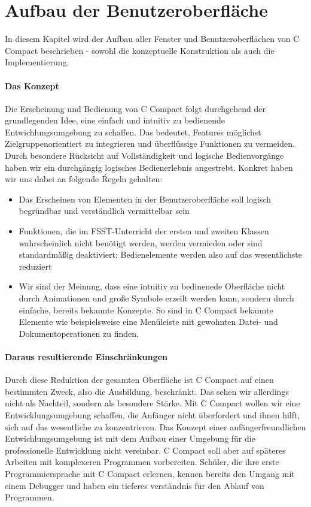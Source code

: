 

\chapter{Aufbau der Benutzeroberfläche}
In diesem Kapitel wird der Aufbau aller Fenster und Benutzeroberflächen von C Compact beschrieben - sowohl die konzeptuelle Konstruktion als auch die Implementierung.
\subsubsection*{Das Konzept}
Die Erscheinung und Bedienung von C Compact folgt durchgehend der grundlegenden Idee, eine einfach und intuitiv zu bedienende Entwichlungsumgebung zu schaffen. Das bedeutet, Features möglichst Zielgruppenorientiert zu integrieren und überflüssige Funktionen zu vermeiden. Durch besondere Rücksicht auf Vollständigkeit und logische Bedienvorgänge haben wir ein durchgängig logisches Bedienerlebnis angestrebt.
Konkret haben wir uns dabei an folgende Ŕegeln gehalten:
\begin{itemize}
\item Das Erscheinen von Elementen in der Benutzeroberfläche soll logisch begründbar und verständlich vermittelbar sein
\item Funktionen, die im FSST-Unterricht der ersten und zweiten Klassen wahrscheinlich nicht benötigt werden, werden vermieden oder sind standardmäßig deaktiviert; Bedienelemente werden also auf das wesentlichste reduziert
\item Wir sind der Meinung, dass eine intuitiv zu bedinenede Oberfläche nicht durch Animationen und große Symbole erzeilt werden kann, sondern durch einfache, bereits bekannte Konzepte. So sind in C Compact bekannte Elemente wie beispielsweise eine Menüleiste mit gewohnten Datei- und Dokumentoperationen zu finden.
\end{itemize}

\subsubsection*{Daraus resultierende Einschränkungen}
Durch diese Reduktion der gesamten Oberfläche ist C Compact auf einen bestimmten Zweck, also die Ausbildung, beschränkt. Das sehen wir allerdings nicht als Nachteil, sondern als besondere Stärke. Mit C Compact wollen wir eine Entwicklungsumgebung schaffen, die Anfänger nicht überfordert und ihnen hilft, sich auf das wesentliche zu konzentrieren.
Das Konzept einer anfängerfreundlichen Entwichlungsumgebung ist mit dem Aufbau einer Umgebung für die professionelle Entwicklung nicht vereinbar. C Compact soll aber auf späteres Arbeiten mit komplexeren Programmen vorbereiten. Schüler, die ihre erste Programmiersprache mit C Compact erlernen, kennen bereits den Umgang mit einem Debugger und haben ein tieferes verständnis für den Ablauf von Programmen.

